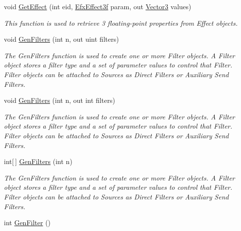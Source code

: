 \begin{DoxyCompactItemize}
void \hyperlink{class_open_t_k_1_1_audio_1_1_open_a_l_1_1_effects_extension_af7fb4cfff41744c887c8d51e54a67701}{Get\-Effect} (int eid, \hyperlink{namespace_open_t_k_1_1_audio_1_1_open_a_l_a1c69083823578d237ab570da681a5cfa}{Efx\-Effect3f} param, out \hyperlink{struct_open_t_k_1_1_vector3}{Vector3} values)
\begin{DoxyCompactList}\small\item\em This function is used to retrieve 3 floating-\/point properties from Effect objects.\end{DoxyCompactList}\item 
void \hyperlink{class_open_t_k_1_1_audio_1_1_open_a_l_1_1_effects_extension_a8832b714b9376a7fe999a8afc589da40}{Gen\-Filters} (int n, out uint filters)
\begin{DoxyCompactList}\small\item\em The Gen\-Filters function is used to create one or more Filter objects. A Filter object stores a filter type and a set of parameter values to control that Filter. Filter objects can be attached to Sources as Direct Filters or Auxiliary Send Filters.\end{DoxyCompactList}\item 
void \hyperlink{class_open_t_k_1_1_audio_1_1_open_a_l_1_1_effects_extension_aded82d26f8ff57e712c6b7b068ae1e4f}{Gen\-Filters} (int n, out int filters)
\begin{DoxyCompactList}\small\item\em The Gen\-Filters function is used to create one or more Filter objects. A Filter object stores a filter type and a set of parameter values to control that Filter. Filter objects can be attached to Sources as Direct Filters or Auxiliary Send Filters.\end{DoxyCompactList}\item 
int\mbox{[}$\,$\mbox{]} \hyperlink{class_open_t_k_1_1_audio_1_1_open_a_l_1_1_effects_extension_a2b3c9e2f60f937096dc8c85d4e6e5e43}{Gen\-Filters} (int n)
\begin{DoxyCompactList}\small\item\em The Gen\-Filters function is used to create one or more Filter objects. A Filter object stores a filter type and a set of parameter values to control that Filter. Filter objects can be attached to Sources as Direct Filters or Auxiliary Send Filters.\end{DoxyCompactList}\item 
int \hyperlink{class_open_t_k_1_1_audio_1_1_open_a_l_1_1_effects_extension_a5c3fc6ea5916498d8590a5db9f3f85d9}{Gen\-Filter} ()

\end{DoxyCompactItemize}

